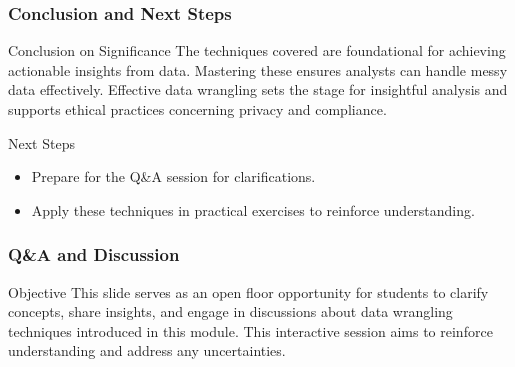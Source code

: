 \documentclass[aspectratio=169]{beamer}
\begin{document}
\begin{frame}[fragile]
    \frametitle{Conclusion and Next Steps}

    \begin{block}{Conclusion on Significance}
        The techniques covered are foundational for achieving actionable insights from data. Mastering these ensures analysts can handle messy data effectively. 
        Effective data wrangling sets the stage for insightful analysis and supports ethical practices concerning privacy and compliance.
    \end{block}

    \begin{block}{Next Steps}
        \begin{itemize}
            \item Prepare for the Q\&A session for clarifications.
            \item Apply these techniques in practical exercises to reinforce understanding.
        \end{itemize}
    \end{block}
\end{frame}

\begin{frame}[fragile]
    \frametitle{Q\&A and Discussion}
    \begin{block}{Objective}
        This slide serves as an open floor opportunity for students to clarify concepts, share insights, and engage in discussions about data wrangling techniques introduced in this module. This interactive session aims to reinforce understanding and address any uncertainties.
    \end{block}
\end{frame}
\end{document}
